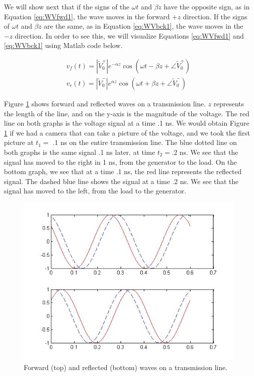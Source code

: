 \documentclass{ximera}
\begin{document}
\begin{example}

We will show next that if  the signs of the $\omega t$ and
$\beta z$ have the opposite sign, as in Equation \ref{eq:WVfwd1}, the wave moves in the forward $+z$
direction. If the signs of $\omega t$ and $\beta z$ are the same, as in Equation \ref{eq:WVbck1}, the
wave moves in the $-z$ direction. In order to see this, we will visualize Equations \ref{eq:WVfwd1} and \ref{eq:WVbck1} using Matlab code below.

\begin{eqnarray}
v_f(t)=|\tilde{V}_0^+| e^{ - \alpha z} \cos(\omega t - \beta z + \angle \tilde{V}_0^+) \label{eq:WVfwd1} \\
v_r(t)= |\tilde{V}_0^-|e^{\alpha z} \cos(\omega t + \beta z + \angle \tilde{V}_0^-) \label{eq:WVbck1}
\end{eqnarray}
\begin{explanation}

Figure \ref{fig:WVfwrdref}  shows forward and reflected waves on a transmission line.  $z$ represents the length of the line,  and on the y-axis is the magnitude of the voltage.   The red line on both graphs is the voltage signal at a time  .1 ns. We would obtain  Figure \ref{fig:WVfwrdref} if we had a camera that can take a picture of the voltage, and we took the first picture at $t_1=$ .1 ns on the entire transmission line.  The blue dotted line on both graphs is the same signal .1 ns later,  at time $t_2=$.2  ns.  We see that the signal has moved to the right in  1 ns,  from the generator to the load.  On the bottom graph, we see that at a time .1 ns, the red line represents the reflected signal.  The dashed blue line shows the signal at a time .2 ns. We see that the signal has moved to the left, from the load to the generator. 


\begin{figure}[ht!]
\begin{center}
\includegraphics[scale=0.5]{../jpg/frwrdwave_01.jpg}
\caption{\label{fig:WVfwrdref} Forward (top) and reflected (bottom) waves on a transmission line.}
\end{center}
\end{figure}



\end{explanation}
\end{example}
\end{document}
